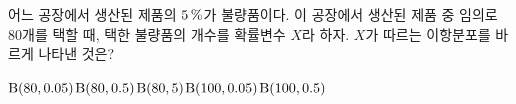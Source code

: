 어느 공장에서 생산된 제품의 $5\mkern3mu \%$가 불량품이다. 이 공장에서 생산된 제품 중 임의로 80개를 택할 때, 택한 불량품의 개수를 확률변수 $X$라 하자. $X$가 따르는 이항분포를 바르게 나타낸 것은?
\begin{choicesii}{$\mathrm{B}(80{,}\mkern3mu\mathopen{}0.05)$}{$\mathrm{B}(80{,}\mkern3mu\mathopen{}0.5)$}{$\mathrm{B}(80{,}\mkern3mu\mathopen{}5)$}{$\mathrm{B}(100{,}\mkern3mu\mathopen{}0.05)$}{$\mathrm{B}(100{,}\mkern3mu\mathopen{}0.5)$}\end{choicesii}
